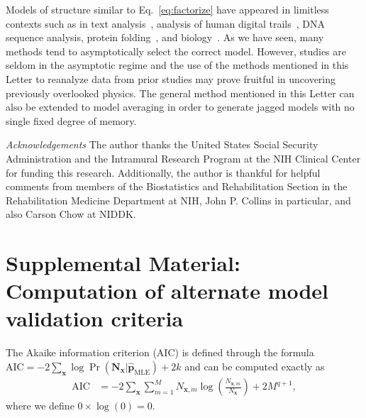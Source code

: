 \documentclass[prl,twocolumn,groupedaddress]{revtex4-1}
\newcommand{\bN}{\mathbf{N}}
\newcommand{\bx}{\mathbf{x}}
\newcommand{\bp}{\mathbf{p}}
\begin{document}
Models of structure similar to Eq.~\ref{eq:factorize} have appeared in limitless contexts such as in text analysis~\cite{melnyk2006memory}, analysis of human digital trails~\cite{singer2014detecting}, DNA sequence analysis, protein folding~\cite{yuan1999prediction}, and biology~\cite{bettenbuhl2012bayesian}. As we have seen, many methods tend to asymptotically select the correct model. However, studies are seldom in the asymptotic regime and the use of the methods mentioned in this Letter to reanalyze data from prior studies may prove fruitful in uncovering previously overlooked physics. The general method mentioned in this Letter can also be extended to model averaging in order to generate jagged models with no single fixed degree of memory.





\emph{Acknowledgements} The author thanks the United States Social Security Administration and the Intramural Research Program at the NIH Clinical Center for funding this research. Additionally, the author is thankful for helpful comments from members of the Biostatistics and Rehabilitation Section in the Rehabilitation Medicine Department at NIH, John P. Collins in particular, and also Carson Chow at NIDDK.




\clearpage
\newpage
\appendix

\section{Supplemental Material: Computation of alternate model validation criteria}


The Akaike information criterion (AIC) is defined through the formula $\textrm{AIC}  = -2 \sum_{\bx}\log \Pr(\bN_\bx \vert \hat{\bp}_{\textrm{MLE}}) + 2k$ and can be computed exactly as
\begin{align}
\textrm{AIC}  &= -2\sum_{\bx}\sum_{m=1}^M N_{\bx,m}\log \left( \frac{N_{\bx,m}}{N_\bx} \right)+ 2M^{q+1},
\end{align}
where we define $0\times\log(0)=0$.
\end{document}
